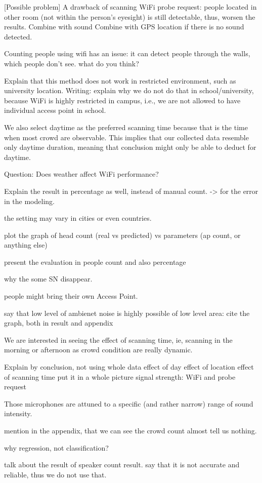 [Possible problem] A drawback of scanning WiFi probe request: people located in other room (not within the person's eyesight) is still detectable, thus, worsen the results.
Combine with sound
Combine with GPS location if there is no sound detected.

Counting people using wifi has an issue: it can detect people through the walls, which people don't see. what do you think?

Explain that this method does not work in restricted environment, such as university location. Writing: explain why we do not do that in school/university, because WiFi is highly restricted in campus, i.e., we are not allowed to have individual access point in school.

We also select daytime as the preferred scanning time because that is the time when most crowd are observable. This implies that our collected data resemble only daytime duration, meaning that conclusion might only be able to deduct for daytime.


Question: Does weather affect WiFi performance?

Explain the result in percentage as well, instead of manual count. -> for the error in the modeling.

the setting may vary in cities or even countries.

plot the graph of head count (real vs predicted) vs parameters (ap count, or anything else)

present the evaluation in people count and also percentage

why the some SN disappear.

people might bring their own Access Point.

say that low level of ambienet noise is highly possible of low level area: cite the graph, both in result and appendix

We are interested in seeing the effect of scanning time, ie, scanning in the morning or afternoon as crowd condition are really dynamic.

Explain by conclusion, not using whole data
effect of day
effect of location
effect of scanning time
put it in a whole picture
signal strength: WiFi and probe request

Those microphones are attuned to a specific (and rather narrow) range of sound intensity.

mention in the appendix, that we can see the crowd count almost tell us nothing.

why regression, not classification?

talk about the result of speaker count result. say that it is not accurate and reliable, thus we do not use that.
